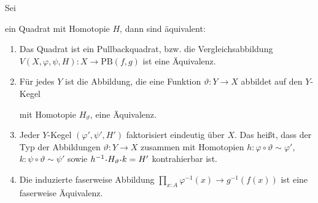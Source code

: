 \begin{lemma}
  Sei
  \begin{center}
  \end{center}
  ein Quadrat mit Homotopie $H$, dann sind äquivalent:
  \begin{enumerate}
  \item Das Quadrat ist ein Pullbackquadrat, bzw. die Vergleichsabbildung $V(X,\varphi,\psi,H):X\to\mathrm{PB}(f,g)$ ist eine Äquivalenz.
  \item Für jedes $Y$ ist die Abbildung, die eine Funktion $\vartheta:Y\to X$ abbildet auf den $Y$-Kegel
    \begin{center}
    \end{center}
    mit Homotopie $H_\vartheta$, eine Äquivalenz.
  \item Jeder $Y$-Kegel $(\varphi',\psi',H')$ faktorisiert eindeutig über $X$. Das heißt, dass der Typ der Abbildungen $\vartheta:Y\to X$ zusammen mit Homotopien $h:\varphi\circ \vartheta\sim\varphi'$, $k:\psi\circ \vartheta\sim\psi'$ sowie $h^{-1}\kon H_\vartheta\kon k = H'$ kontrahierbar ist.
  \item Die induzierte faserweise Abbildung $\prod_{x:A}\varphi^{-1}(x)\to g^{-1}(f(x))$ ist eine faserweise Äquivalenz.
  \end{enumerate}
\end{lemma}

